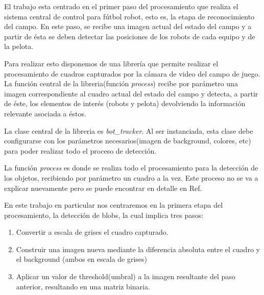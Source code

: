 \documentclass[a4paper,10pt]{report}
\begin{document}
El trabajo esta centrado en el primer paso del procesamiento que realiza el sistema central de control para fútbol robot, esto es, la etapa de reconocimiento del campo. 
En este paso, se recibe una imagen actual del estado del campo y a partir de ésta se deben detectar las posiciones de los robots de cada equipo y de la pelota.


Para realizar esto disponemos de una librería \cite{Jaureguiberry} que permite realizar el procesamiento de cuadros capturados por la cámara de video del campo de juego. 
La función central de la libreria(función \textit{process}) recibe por parámetro una imagen correspondiente al cuadro actual del estado del campo y detecta, a partir de éste, los elementos de interés 
(robots y pelota) devolviendo la información relevante asociada a éstos. 



La clase central de la libreria es \textit{bot\_tracker}.
Al ser instanciada, esta clase debe configurarse con los parámetros necesarios(imagen de background, colores, etc) para poder realizar todo el proceso de detección.

La función \textit{process} es donde se realiza todo el procesamiento para la detección de los objetos, recibiendo por parámetro un cuadro a la vez.
Este proceso no se va a explicar nuevamente pero se puede encontrar en detalle en Ref. \cite[capitulo 5]{Jaureguiberry}

En este trabajo en particular nos centraremos en la primera etapa del procesamiento, la detección de blobs, la cual implica tres pasos:

\begin{enumerate}
 \item Convertir a escala de grises el cuadro capturado.
 \item Construir una imagen nueva mediante la diferencia absoluta entre el cuadro y el background (ambos en escala de grises)
 \item Aplicar un valor de threshold(umbral) a la imagen resultante del paso anterior, resultando en una matriz binaria. 
\end{enumerate}
\end{document}
